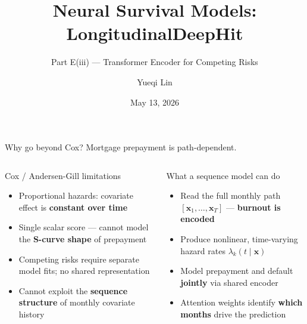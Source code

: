 \documentclass[10pt,aspectratio=169]{beamer}
\title{Neural Survival Models: LongitudinalDeepHit}
\subtitle{Part E(iii) --- Transformer Encoder for Competing Risks}
\author{Yueqi Lin}
\institute{MTH 9877 --- Baruch College, Spring 2026}
\date{May 13, 2026}
\begin{document}
\begin{frame}[plain]
    \titlepage
\end{frame}

\begin{frame}{Why go beyond Cox? Mortgage prepayment is path-dependent.}
    \begin{columns}[T,onlytextwidth]
        \begin{block}{Cox / Andersen-Gill limitations}
        \small
        \begin{itemize}\itemsep4pt
            \item Proportional hazards: covariate effect is \textbf{constant over time}
            \item Single scalar score — cannot model the \textbf{S-curve shape} of prepayment
            \item Competing risks require separate model fits; no shared representation
            \item Cannot exploit the \textbf{sequence structure} of monthly covariate history
        \end{itemize}
        \end{block}

        \begin{block}{What a sequence model can do}
        \small
        \begin{itemize}\itemsep4pt
            \item Read the full monthly path $[\mathbf{x}_1, \dots, \mathbf{x}_T]$ --- \textbf{burnout is encoded}
            \item Produce nonlinear, time-varying hazard rates $\lambda_k(t \mid \mathbf{x})$
            \item Model prepayment and default \textbf{jointly} via shared encoder
            \item Attention weights identify \textbf{which months} drive the prediction
        \end{itemize}
        \end{block}
    \end{columns}
\end{frame}
\end{document}

